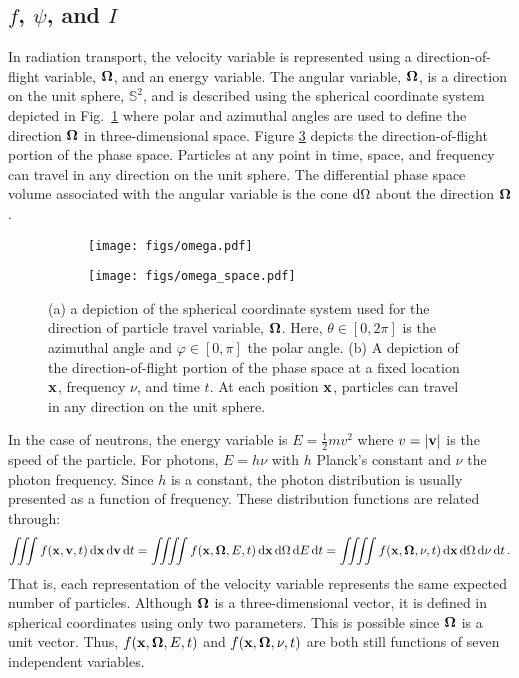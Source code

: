 \documentclass[../doc.tex]{subfiles}
\begin{document}
\subsection{$f$, $\psi$, and $I$}
In radiation transport, the velocity variable is represented using a direction-of-flight variable, $\boldsymbol{\Omega}$, and an energy variable. 
The angular variable, $\boldsymbol{\Omega}$, is a direction on the unit sphere, $\mathbb{S}^2$, and is described using the spherical coordinate system depicted in Fig.~\ref{trans:spherical_coords} where polar and azimuthal angles are used to define the direction $\boldsymbol{\Omega}$ in three-dimensional space. 
Figure \ref{trans:omega_phase} depicts the direction-of-flight portion of the phase space. Particles at any point in time, space, and frequency can travel in any direction on the unit sphere. The differential phase space volume associated with the angular variable is the cone $\mathop{}\!\mathrm{d}\Omega$ about the direction $\boldsymbol{\Omega}$. 
\begin{figure}
\centering
\begin{subfigure}{.49\textwidth}
	\centering
	\texttt{[image: figs/omega.pdf]}
	\caption{}
	\label{trans:spherical_coords}
\end{subfigure}
\begin{subfigure}{.49\textwidth}
	\centering
	\texttt{[image: figs/omega\_space.pdf]}
	\caption{}
	\label{trans:omega_phase}
\end{subfigure}
\caption{(a) a depiction of the spherical coordinate system used for the direction of particle travel variable, $\boldsymbol{\Omega}$. Here, $\theta \in [0,2\pi]$ is the azimuthal angle and $\varphi \in [0,\pi]$ the polar angle. (b) A depiction of the direction-of-flight portion of the phase space at a fixed location $\boldsymbol{\mathrm{x}}$, frequency $\nu$, and time $t$. At each position $\boldsymbol{\mathrm{x}}$, particles can travel in any direction on the unit sphere.}
\end{figure}

In the case of neutrons, the energy variable is $E = \frac{1}{2}mv^2$ where $v = |\boldsymbol{\mathrm{v}}|$ is the speed of the particle. For photons, $E = h\nu$ with $h$ Planck's constant and $\nu$ the photon frequency. Since $h$ is a constant, the photon distribution is usually presented as a function of frequency. These distribution functions are related through: 
	\begin{equation}
		\iiint f(\x,\v,t) \ud \x \ud \v \ud t = \iiiint f(\x,\Omegahat,E,t) \ud \x \ud \Omega \ud E \ud t = \iiiint f(\x,\Omegahat,\nu,t) \ud \x \ud \Omega \ud \nu \ud t \,. 
	\end{equation}
That is, each representation of the velocity variable represents the same expected number of particles. 
Although $\boldsymbol{\Omega}$ is a three-dimensional vector, it is defined in spherical coordinates using only two parameters. This is possible since $\boldsymbol{\Omega}$ is a unit vector. 
Thus, $f(\boldsymbol{\mathrm{x}},\boldsymbol{\Omega},E,t)$ and $f(\boldsymbol{\mathrm{x}},\boldsymbol{\Omega},\nu,t)$ are both still functions of seven independent variables. 
\end{document}
